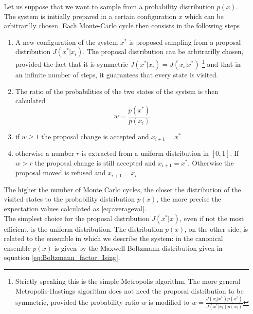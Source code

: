 \vspace{10pt}
Let us suppose that we want to sample from a probability distribution $p(x)$. \\
The system is initially prepared in a certain configuration $x$ which can be arbitrarilly chosen. Each Monte-Carlo cycle then consists in the following steps
\begin{enumerate}
    \item A new configuration of the system $x^*$ is proposed sampling from a proposal distribution $J(x^*|x_i)$. The proposal distribution can be arbitrarilly chosen, provided the fact that it is symmetric $J(x^*|x_i) = J(x_i|x^*)$
    \footnote{Strictly speaking this is the simple Metropolis algorithm. The more general Metropolis-Hastings algorithm does not need the proposal distribution to be symmetric, provided the probability ratio $w$ is modified to $w=\frac{J(x_i|x^*)p(x^*)}{J(x^*|x_i)p(x_i)}$}
    and that in an infinite number of steps, it guarantees that every state is visited.
    \item The ratio of the probabilities of the two states of the system is then calculated
    \begin{equation*}
        w = \frac{p(x^*)}{p(x_i)}
    \end{equation*}
    \item if $w \geq 1$ the proposal change is accepted and $x_{i+1} = x^*$
    \item otherwise a number $r$ is extracted from a uniform distribution in $[0,1]$. If $w > r$ the proposal change is still accepted and $x_{i+1} = x^*$. Otherwise the proposal moved is refused and $x_{i+1} = x_i$
\end{enumerate}
The higher the number of Monte Carlo cycles, the closer the distribution of the visited states to the probability distribution $p(x)$, the more precise the expectation values calculated as \ref{eq:averageval}. \\
The simplest choice for the proposal distribution $J(x^*|x)$, even if not the most efficient, is the uniform distribution. The distribution $p(x)$, on the other side, is related to the ensemble 
in which we describe the system: in the canonical ensemble $p(x)$ is given by the Maxwell-Boltzmann distribution given in equation \ref{eq:Boltzmann_factor_Ising}.
\newpage

